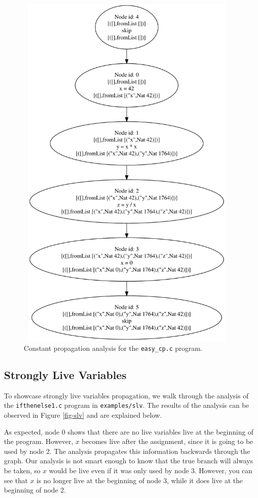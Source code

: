 \documentclass{article}
\begin{document}
\begin{figure}
\centering
\includegraphics[width=11cm, height=18cm]{cp_easy}
\caption{Constant propagation analysis for the \texttt{easy\_cp.c} program.}
\label{fig-cp}
\end{figure}

\subsection*{Strongly Live Variables}

To showcase strongly live variables propagation, we walk through the analysis of the \texttt{ifthenelse1.c} program in \texttt{examples/slv}. The results of the analysis can be observed in Figure \ref{fig-slv} and are explained below.

As expected, node 0 shows that there are no live variables live at the beginning of the program. However, $x$ becomes live after the assignment, since it is going to be used by node 2. The analysis propagates this information backwards through the graph. Our analysis is not smart enough to know that the true branch will always be taken, so $x$ would be live even if it was only used by node 3. However, you can see that $x$ is no longer live at the beginning of node 3, while it does live at the beginning of node 2.
\end{document}
